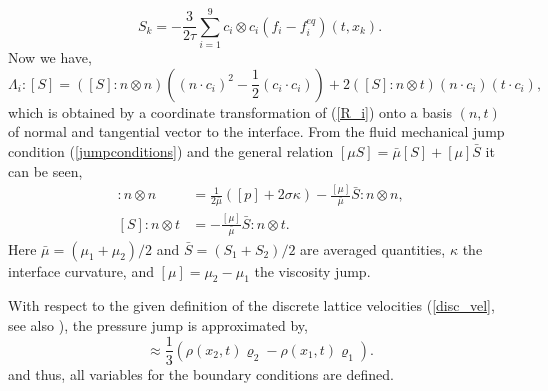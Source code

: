 \documentclass[final,leqno,onefignum,onetabnum]{siamltexmm}
\begin{document}
\begin{equation}
  S_k = -\frac{3}{2\tau } \sum_{i=1}^9 c_i \otimes c_i(f_i-f_i^{eq})(t,x_k) \text{.}
\end{equation}
Now we have,
\begin{equation}
  \Lambda_i:[S] = ([S]:n \otimes n)((n \cdot c_i)^2 - \frac12 (c_i \cdot c_i)) + 2([S]:n \otimes t)(n \cdot c_i)(t \cdot c_i) \text{,}
  \label{Lambda_iTimes_S}
\end{equation}
which is obtained by a coordinate transformation of (\ref{R_i}) onto a basis $(n, t)$ of normal and tangential vector to the interface. From the fluid mechanical jump condition (\ref{jumpconditions}) and the general relation $[\mu S] = \bar{\mu}[S] + [\mu]\bar{S} $ it can be seen,
\begin{align}
  [S]:n \otimes n &=  \frac{1}{2 \bar\mu} ([p] + 2 \sigma \kappa) - \frac{[\mu]}{\bar{\mu}} \bar{S} : n \otimes n \text{,} \\
  [S]:n \otimes t &= - \frac{[\mu]}{\bar{\mu}} \bar{S} : n \otimes t \text{.}
\end{align}
Here $\bar{\mu} = (\mu_1 + \mu_2)/2$ and $\bar{S} = (S_1 + S_2)/2$ are averaged quantities, $\kappa$ the interface curvature, and  $[\mu] = \mu_2 - \mu_1$ the viscosity jump.

With respect to the given definition of the discrete lattice velocities (\ref{disc_vel}, see also \cite{Thoemmes2}), the pressure jump is approximated by,
\begin{equation}
	[p] \approx \frac{1}{3} (\rho(x_2,t)\varrho_2 - \rho(x_1,t)\varrho_1) \text{.}
\end{equation}
and thus, all variables for the boundary conditions are defined.
\end{document}

